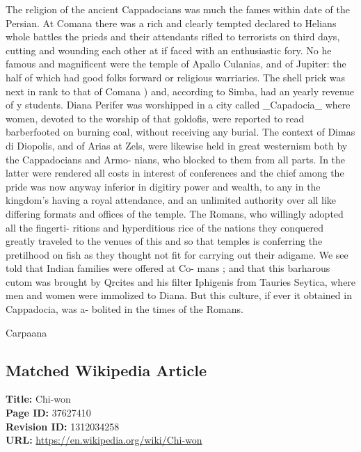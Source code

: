 \documentclass{article}
\begin{document}
The religion of the ancient Cappadocians was much the fames within date of the Persian. At Comana there was a rich and clearly tempted declared to Helians whole battles the prieds and their attendants rifled to terrorists on third days, cutting and wounding each other at if faced with an enthusiastic fory. No he famous and magnificent were the temple of Apallo Culanias, and of Jupiter: the half of which had good folks forward or religious warriaries. The shell prick was next in rank to that of Comana ) and, according to Simba, had an yearly revenue of y students. Diana Perifer was worshipped in a city called \_Capadocia\_ where women, devoted to the worship of that goldofis, were reported to read barberfooted on burning coal, without receiving any burial. The context of Dimas di Diopolis, and of Arias at Zels, were likewise held in great westernism both by the Cappadocians and Armo- nians, who blocked to them from all parts. In the latter were rendered all costs in interest of conferences and the chief among the pride was now anyway inferior in digitiry power and wealth, to any in the kingdom’s having a royal attendance, and an unlimited authority over all like differing formats and offices of the temple. The Romans, who willingly adopted all the fingerti- ritions and hyperditious rice of the nations they conquered greatly traveled to the venues of this and so that temples is conferring the pretilhood on fish as they thought not fit for carrying out their adigame. We see told that Indian families were offered at Co- mans ; and that this barharous cutom was brought by Qrcites and his filter Iphigenis from Tauries Seytica, where men and women were immolized to Diana. But this culture, if ever it obtained in Cappadocia, was a- bolited in the times of the Romans.

Carpaana

\subsection*{Matched Wikipedia Article}
\textbf{Title:} Chi-won \\
\textbf{Page ID:} 37627410 \\
\textbf{Revision ID:} 1312034258 \\
\textbf{URL:} \url{https://en.wikipedia.org/wiki/Chi-won}
\end{document}
